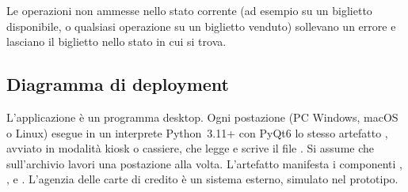 Le operazioni non ammesse nello stato corrente (ad esempio  su un biglietto disponibile, o qualsiasi operazione su un biglietto venduto) sollevano un errore e lasciano il biglietto nello stato in cui si trova.

\subsection{Diagramma di deployment}


L'applicazione è un programma desktop. Ogni postazione (PC Windows, macOS o Linux) esegue in un interprete Python~3.11+ con PyQt6 lo stesso artefatto , avviato in modalità kiosk o cassiere, che legge e scrive il file . Si assume che sull'archivio lavori una postazione alla volta. L'artefatto manifesta i componenti , ,  e . L'agenzia delle carte di credito è un sistema esterno, simulato nel prototipo.
